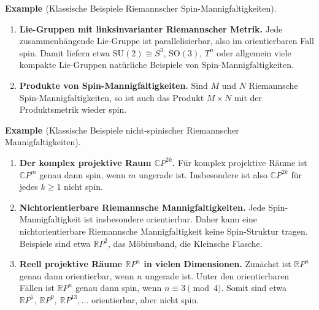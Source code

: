 \documentclass[10pt, letterpaper]{article}
\newcommand{\SO}{\mathrm{SO}}
\newcommand{\SU}{\mathrm{SU}}
\newcommand{\CP}{\mathbb{C} P}
\newcommand{\RP}{\mathbb{R} P}
\newcommand{\CustomHeading}[3]{%
  \par\medskip\noindent%
  \textbf{#1 #2} \textnormal{(#3)}.\enskip%
}
\newenvironment{EXA}[2]{\CustomHeading{Example}{#1}{#2}}{}
\begin{document}
\begin{EXA}{\parencite[p.~85-93]{LawsonMichelsohn2016}}{Klassische Beispiele Riemannscher Spin-Mannigfaltigkeiten}
\begin{enumerate}
    \item \textbf{Lie-Gruppen mit linksinvarianter Riemannscher Metrik.}  
    Jede zusammenhängende Lie-Gruppe ist parallelisierbar, also im orientierbaren Fall spin. Damit liefern etwa \(\SU(2)\cong S^3\), \(\SO(3)\), \(T^n\) oder allgemein viele kompakte Lie-Gruppen natürliche Beispiele von Spin-Mannigfaltigkeiten.

    \item \textbf{Produkte von Spin-Mannigfaltigkeiten.}  
    Sind \(M\) und \(N\) Riemannsche Spin-Mannigfaltigkeiten, so ist auch das Produkt \(M\times N\) mit der Produktsmetrik wieder spin.
\end{enumerate}

\end{EXA}

\begin{EXA}{\parencite[p.~85-93]{LawsonMichelsohn2016}}{Klassische Beispiele nicht-spinischer Riemannscher Mannigfaltigkeiten}

\begin{enumerate}
    \item \textbf{Der komplex projektive Raum \(\CP^{2k}\).}  
    Für komplex projektive Räume ist $\CP^m$ genau dann spin, wenn $m$ ungerade ist.
    Insbesondere ist also \(\CP^{2k}\) für jedes \(k\ge 1\) nicht spin.

    \item \textbf{Nichtorientierbare Riemannsche Mannigfaltigkeiten.}  
    Jede Spin-Mannigfaltigkeit ist insbesondere orientierbar. Daher kann eine nichtorientierbare Riemannsche Mannigfaltigkeit keine Spin-Struktur tragen. Beispiele sind etwa $\RP^{2}$, das Möbiusband, die Kleinsche Flasche.

    \item \textbf{Reell projektive Räume \(\RP^n\) in vielen Dimensionen.}  
    Zunächst ist \(\RP^n\) genau dann orientierbar, wenn \(n\) ungerade ist. Unter den orientierbaren Fällen ist \(\RP^n\) genau dann spin, wenn $n\equiv 3 \pmod 4$. Somit sind etwa $\RP^5,\ \RP^9,\ \RP^{13},\dots$ orientierbar, aber nicht spin.
\end{enumerate}

\end{EXA}
\end{document}
